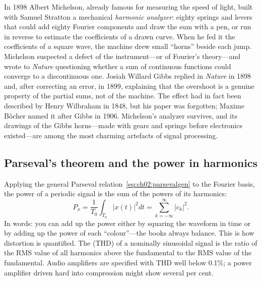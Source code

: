 \begin{history}
In 1898 Albert Michelson, already famous for measuring the speed of light, built with Samuel
Stratton a mechanical \emph{harmonic analyzer}: eighty springs and levers that could add eighty
Fourier components and draw the sum with a pen, or run in reverse to estimate the coefficients of a
drawn curve. When he fed it the coefficients of a square wave, the machine drew small ``horns''
beside each jump. Michelson suspected a defect of the instrument---or of Fourier's theory---and wrote
to \emph{Nature} questioning whether a sum of continuous functions could converge to a
discontinuous one. Josiah Willard Gibbs replied in \emph{Nature} in 1898 and, after correcting an
error, in 1899, explaining that the overshoot is a genuine property of the partial sums, not of the
machine. The effect had in fact been described by Henry Wilbraham in 1848, but his paper was
forgotten; Maxime B\^ocher named it after Gibbs in 1906. Michelson's analyzer survives, and its
drawings of the Gibbs horns---made with gears and springs before electronics existed---are among the
most charming artefacts of signal processing.
\end{history}

\subsection{Parseval's theorem and the power in harmonics}

Applying the general Parseval relation~\eqref{eq:ch02:parsevalgen} to the Fourier basis, the
power of a periodic signal is the sum of the powers of its harmonics:
\begin{equation}
P_x=\frac{1}{T_0}\int_{T_0}|x(t)|^2dt=\sum_{k=-\infty}^{\infty}|c_k|^2 .
\label{eq:ch02:parsevalfs}
\end{equation}
In words: you can add up the power either by squaring the waveform in time or by adding up the
power of each ``colour''---the books always balance. This is how distortion is quantified. The
 (THD) of a nominally sinusoidal signal is the ratio of the RMS value
of all harmonics above the fundamental to the RMS value of the fundamental. Audio amplifiers are
specified with THD well below 0.1\%; a power amplifier driven hard into compression might show
several per cent.


